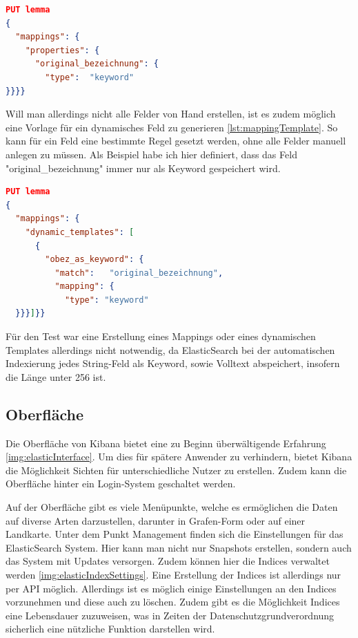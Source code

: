 \begin{lstlisting}[language=json, frame=single, label={lst:mapping}] 
PUT lemma
{
  "mappings": {
    "properties": {
      "original_bezeichnung": {
        "type":  "keyword"
}}}}
\end{lstlisting}

Will man allerdings nicht alle Felder von Hand erstellen, ist es zudem möglich eine Vorlage für ein dynamisches Feld zu generieren \ref{lst:mappingTemplate}. So kann für ein Feld eine bestimmte Regel gesetzt werden, ohne alle Felder manuell anlegen zu müssen. Als Beispiel habe ich hier definiert, dass das Feld "original\_bezeichnung" immer nur als Keyword gespeichert wird.

\begin{lstlisting}[language=json, frame=single, label={lst:mappingTemplate}] 
PUT lemma
{
  "mappings": {
    "dynamic_templates": [
      {
        "obez_as_keyword": {
          "match":   "original_bezeichnung",
          "mapping": {
            "type": "keyword"
  }}}]}}
\end{lstlisting}

Für den Test war eine Erstellung eines Mappings oder eines dynamischen Templates allerdings nicht notwendig, da ElasticSearch bei der automatischen Indexierung jedes String-Feld als Keyword, sowie Volltext abspeichert, insofern die Länge unter 256 ist.

\subsection{Oberfläche}

Die Oberfläche von Kibana bietet eine zu Beginn überwältigende Erfahrung \ref{img:elasticInterface}. Um dies für spätere Anwender zu verhindern, bietet Kibana die Möglichkeit Sichten für unterschiedliche Nutzer zu erstellen. Zudem kann die Oberfläche hinter ein Login-System geschaltet werden.

Auf der Oberfläche gibt es viele Menüpunkte, welche es ermöglichen die Daten auf diverse Arten darzustellen, darunter in Grafen-Form oder auf einer Landkarte. Unter dem Punkt Management finden sich die Einstellungen für das ElasticSearch System. Hier kann man nicht nur Snapshots erstellen, sondern auch das System mit Updates versorgen. Zudem können hier die Indices verwaltet werden \ref{img:elasticIndexSettings}. Eine Erstellung der Indices ist allerdings nur per API möglich. Allerdings ist es möglich einige Einstellungen an den Indices vorzunehmen und diese auch zu löschen. Zudem gibt es die Möglichkeit Indices eine Lebensdauer zuzuweisen, was in Zeiten der Datenschutzgrundverordnung sicherlich eine nützliche Funktion darstellen wird. 

